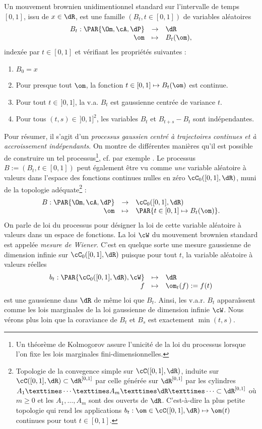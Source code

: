 Un mouvement brownien unidimentionnel standard sur l'intervalle de temps
$[0,1]$, issu de $x\in\dR$, est une famille $(B_t,t\in[0,1])$ de variables
aléatoires
$$
\begin{array}[c]{rcl}
B_t:\PAR{\Om,\cA,\dP}&\to&\dR\\
\om&\mapsto&B_t(\om),
\end{array}
$$
indexée par $t\in[0,1]$ et vérifiant les propriétés suivantes :
\begin{enumerate}
\item $B_0=x$
\item Pour presque tout $\om$, la fonction $t\in[0,1]\mapsto B_t(\om)$ est
  continue.
\item Pour tout $t\in\,]0,1]$, la v.a. $B_t$ est gaussienne centrée de
  variance $t$.
\item Pour tous $(t,s)\in\,]0,1]^2$, les variables $B_t$ et $B_{t+s}-B_t$ sont
  indépendantes.
\end{enumerate}
Pour résumer, il s'agit d'un \emph{processus gaussien centré à trajectoires
  continues et à accroissement indépendants}. On montre de différentes
manières qu'il est possible de construire un tel processus\footnote{Un
  théorème de Kolmogorov assure l'unicité de la loi du processus lorsque l'on
  fixe les lois marginales fini-dimensionnelles.}, cf. par exemple
\cite{karatzas-shreve}. Le processus $B:=(B_t,t\in[0,1])$ peut également être
vu comme \emph{une} variable aléatoire à valeurs dans l'espace des fonctions
continues nulles en zéro $\cC_0([0,1],\dR)$, muni de la topologie
adéquate\footnote{Topologie de la convegence simple sur $\cC([0,1],\dR)$,
  induite sur $\cC([0,1],\dR)\subset\dR^{[0,1]}$ par celle générée sur
  $\dR^{[0,1]}$ par les cylindres $A_1 × \cdots × A_m × \dR × \cdots \subset
  \dR^{[0,1]}$ où $m\geq 0$ et les $A_1,\ldots,A_m$ sont des ouverts de $\dR$.
  C'est-à-dire la plus petite topologie qui rend les applications
  $b_t:\om\in\cC([0,1],\dR)\mapsto \om(t)$ continues pour tout $t\in[0,1]$.} :
$$
\begin{array}[c]{rcl}
B:\PAR{\Om,\cA,\dP}&\to&\cC_0([0,1],\dR)\\
\om&\mapsto&\PAR{t\in[0,1]\mapsto B_t(\om)}.
\end{array}
$$
On parle de loi du processus pour désigner la loi de cette variable
aléatoire à valeurs dans un espace de fonctions. La loi $\cW$ du mouvement
brownien standard est appelée \emph{mesure de Wiener}. C'est en quelque sorte
une mesure gaussienne de dimension infinie sur $\cC_0([0,1],\dR)$ puisque pour
tout $t$, la variable aléatoire à valeurs réelles
$$
\begin{array}[c]{rcl}
b_t:\PAR{\cC_0([0,1],\dR),\cW}&\mapsto&\dR\\
f&\mapsto& \om_t(f):=f(t)
\end{array}
$$
est une gaussienne dans $\dR$ de même loi que $B_t$.  Ainsi, les v.a.r.
$B_t$ apparaîssent comme les lois marginales de la loi gaussienne de dimension
infinie $\cW$. Nous vérons plus loin que la coraviance de $B_t$ et $B_s$ est
exactement $\min(t,s)$.

